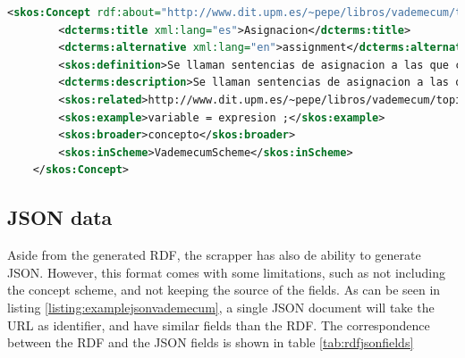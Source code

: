\begin{center} 
  \begin{lstlisting}[language=XML, captionpos=b, caption=Example extractor, label=listing:examplerdfvademecum]   
    <skos:Concept rdf:about="http://www.dit.upm.es/~pepe/libros/vademecum/topics/26.html">
        <dcterms:title xml:lang="es">Asignacion</dcterms:title>
        <dcterms:alternative xml:lang="en">assignment</dcterms:alternative>
        <skos:definition>Se llaman sentencias de asignacion a las que cargan un nuevo valor en una variable</skos:definition>
        <dcterms:description>Se llaman sentencias de asignacion a las que cargan un nuevo valor en una variable: El tipo de la variable debe ser igual al de la expresion en tipos primitivos: asignable por promocion (ver \" Promocion\") asignable por reduccion (ver \" Reduccion\") en objetos: asignable por Upcasting (ver \"Casting\") asignable por Downcasting (ver \"Casting\")</dcterms:description>
        <skos:related>http://www.dit.upm.es/~pepe/libros/vademecum/topics/122.html</skos:related> <skos:related>http://www.dit.upm.es/~pepe/libros/vademecum/topics/242.html</skos:related> <skos:related>http://www.dit.upm.es/~pepe/libros/vademecum/topics/247.html</skos:related> <skos:related>http://www.dit.upm.es/~pepe/libros/vademecum/topics/288.html</skos:related> <skos:related>http://www.dit.upm.es/~pepe/libros/vademecum/topics/47.html</skos:related> <skos:related>http://www.dit.upm.es/~pepe/libros/vademecum/topics/86.html</skos:related> <skos:related>http://www.dit.upm.es/~pepe/libros/vademecum/topics/47.html</skos:related> <skos:related>http://www.dit.upm.es/~pepe/libros/vademecum/topics/3.html</skos:related> <skos:related>http://www.dit.upm.es/~pepe/libros/vademecum/topics/27.html</skos:related> <skos:related>http://www.dit.upm.es/~pepe/libros/vademecum/topics/28.html</skos:related> 
        <skos:example>variable = expresion ;</skos:example>
        <skos:broader>concepto</skos:broader>        
        <skos:inScheme>VademecumScheme</skos:inScheme>
    </skos:Concept>
 \end{lstlisting}
\end{center}


\subsection{JSON data}

Aside from the generated \ac{RDF}, the scrapper has also de ability to generate JSON. However, this format comes with some limitations, such as not including the concept scheme, and not keeping the source of the fields. As can be seen in listing \ref{listing:examplejsonvademecum}, a single JSON document will take the URL as identifier, and have similar fields than the \ac{RDF}. The correspondence between the \ac{RDF} and the JSON fields is shown in table \ref{tab:rdfjsonfields}


